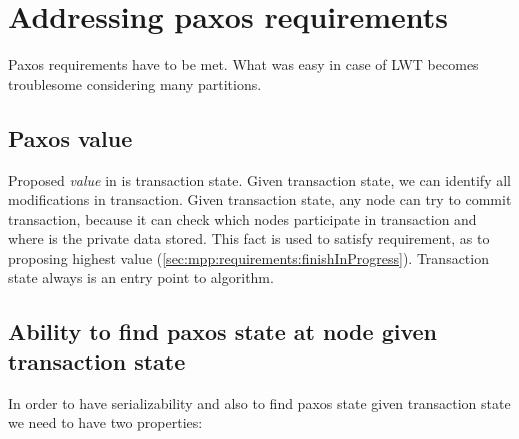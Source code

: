 















\section{Addressing paxos requirements}
Paxos requirements have to be met. What was easy in case of LWT becomes troublesome considering many partitions. 


\subsection{Paxos value}
Proposed \emph{value} in \mpp is transaction state. Given transaction state, we can identify all modifications in transaction. Given transaction state, any node can try to commit transaction, because it can check which nodes participate in transaction and where is the private data stored. This fact is used to satisfy requirement, as to proposing highest value (\ref{sec:mpp:requirements:finishInProgress}).
Transaction state always is an entry point to algorithm.


\subsection{Ability to find paxos state at node given transaction state}
In order to have serializability and also to find paxos state given transaction state we need to have two properties:

